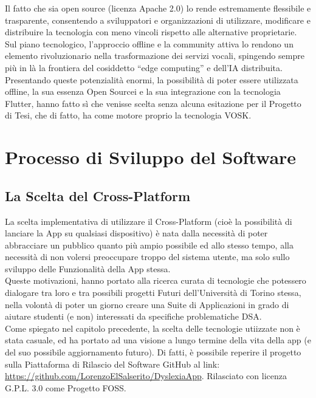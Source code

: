 \documentclass[14pt]{extbook}
\begin{document}
Il fatto che sia open source (licenza Apache 2.0) lo rende estremamente flessibile e trasparente, consentendo a sviluppatori e organizzazioni di utilizzare, modificare e distribuire la tecnologia con meno vincoli rispetto alle alternative proprietarie. Sul piano tecnologico, l’approccio offline e la community attiva lo rendono un elemento rivoluzionario nella trasformazione dei servizi vocali, spingendo sempre più in là la frontiera del cosiddetto “edge computing” e dell’IA distribuita.\\

Presentando queste potenzialità enormi, la possibilità di poter essere utilizzata offline, la sua essenza Open Sourcei e la sua integrazione con la tecnologia Flutter, hanno fatto sì che venisse scelta senza alcuna esitazione per il Progetto di Tesi, che di fatto, ha come motore proprio la tecnologia VOSK.
\pagebreak
\clearpage
\chapter{Processo di Sviluppo del Software}
\section{La Scelta del Cross-Platform}
La scelta implementativa di utilizzare il Cross-Platform (cioè la possibilità di lanciare la App su qualsiasi dispositivo) è nata dalla necessità di poter abbracciare un pubblico quanto più ampio possibile ed allo stesso tempo, alla necessità di non volersi preoccupare troppo del sistema utente, ma solo sullo sviluppo delle Funzionalità della App stessa.\\

Queste motivazioni, hanno portato alla ricerca curata di tecnologie che potessero dialogare tra loro e tra possibili progetti Futuri dell'Università di Torino stessa, nella volontà di poter un giorno creare una Suite di Applicazioni in grado di aiutare studenti (e non) interessati da specifiche problematiche DSA.\\

Come spiegato nel capitolo precedente, la scelta delle tecnologie utiizzate non è stata casuale, ed ha portato ad una visione a lungo termine della vita della app (e del suo possibile aggiornamento futuro). Di fatti, è possibile reperire il progetto sulla Piattaforma di Rilascio del Software GitHub al link: \url{https://github.com/LorenzoElSalserito/DyslexiaApp}. Rilasciato con licenza G.P.L. 3.0 come Progetto FOSS.\\
\pagebreak
\end{document}
